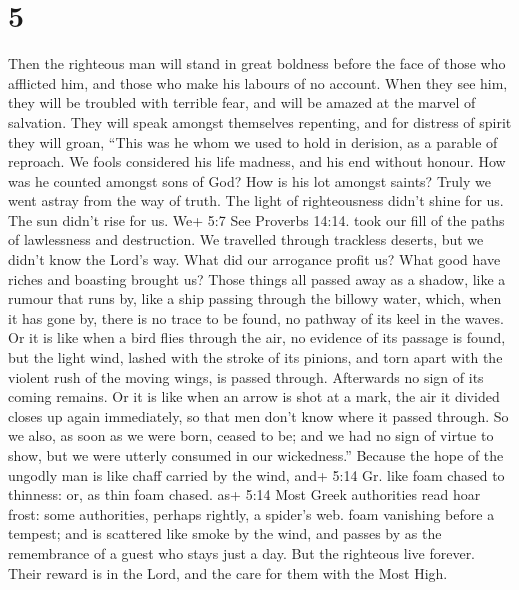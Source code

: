 \hypertarget{section-3}{%
\section{5}\label{section-3}}

 Then the righteous man will stand in great boldness before
the face of those who afflicted him, and those who make his labours of
no account.  When they see him, they will be troubled with
terrible fear, and will be amazed at the marvel of salvation.
 They will speak amongst themselves repenting, and for
distress of spirit they will groan, ``This was he whom we used to hold
in derision, as a parable of reproach.  We fools considered
his life madness, and his end without honour.  How was he
counted amongst sons of God? How is his lot amongst saints? 
Truly we went astray from the way of truth. The light of righteousness
didn't shine for us. The sun didn't rise for us.  We+ 5:7
See Proverbs 14:14. took our fill of the paths of lawlessness and
destruction. We travelled through trackless deserts, but we didn't know
the Lord's way.  What did our arrogance profit us? What good
have riches and boasting brought us?  Those things all
passed away as a shadow, like a rumour that runs by,  like
a ship passing through the billowy water, which, when it has gone by,
there is no trace to be found, no pathway of its keel in the waves.
 Or it is like when a bird flies through the air, no
evidence of its passage is found, but the light wind, lashed with the
stroke of its pinions, and torn apart with the violent rush of the
moving wings, is passed through. Afterwards no sign of its coming
remains.  Or it is like when an arrow is shot at a mark,
the air it divided closes up again immediately, so that men don't know
where it passed through.  So we also, as soon as we were
born, ceased to be; and we had no sign of virtue to show, but we were
utterly consumed in our wickedness.''  Because the hope of
the ungodly man is like chaff carried by the wind, and+ 5:14 Gr. like
foam chased to thinness: or, as thin foam chased. as+ 5:14 Most Greek
authorities read hoar frost: some authorities, perhaps rightly, a
spider's web. foam vanishing before a tempest; and is scattered like
smoke by the wind, and passes by as the remembrance of a guest who stays
just a day.  But the righteous live forever. Their reward
is in the Lord, and the care for them with the Most High. 
